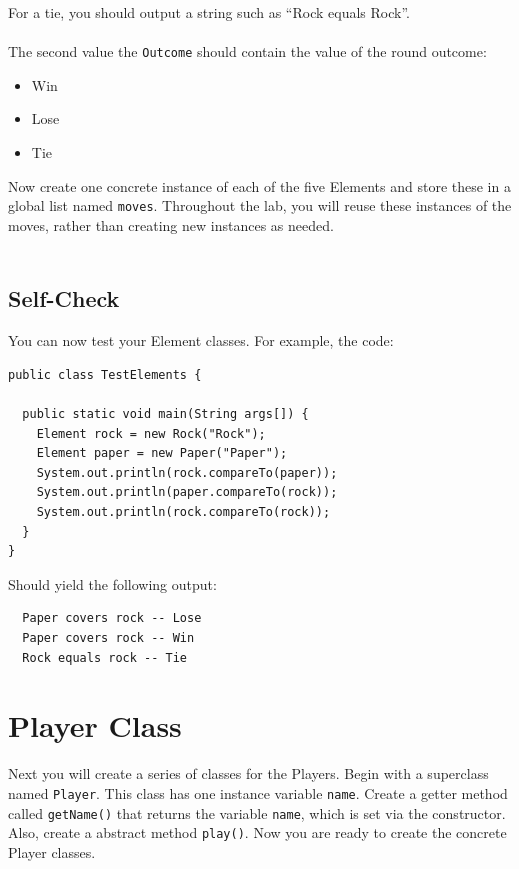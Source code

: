 \documentclass{article}
\begin{document}
\noindent For a tie, you should output a string such as ``Rock equals Rock''.
\\\\
\noindent The second value the \verb|Outcome| should contain the value of the round outcome:
\begin{multicols}{3}
 \begin{itemize}
  \item Win
  \item Lose
  \item Tie
 \end{itemize}

\end{multicols}

\noindent Now create one concrete instance of each of the five Elements and store these in a global list named \verb|moves|. Throughout the lab, you will reuse these instances of the moves, rather than creating new instances as needed.\\\\

\begin{tcolorbox}
 \section*{Self-Check}
 You can now test your Element classes. For example, the code:
 \begin{lstlisting}
public class TestElements {

  public static void main(String args[]) {
    Element rock = new Rock("Rock");
    Element paper = new Paper("Paper");
    System.out.println(rock.compareTo(paper));
    System.out.println(paper.compareTo(rock));
    System.out.println(rock.compareTo(rock));
  }
}
 \end{lstlisting}
 
 Should yield the following output:
 
 \begin{verbatim}
  Paper covers rock -- Lose
  Paper covers rock -- Win
  Rock equals rock -- Tie
 \end{verbatim}
\end{tcolorbox}

\section*{Player Class}
Next you will create a series of classes for the Players. Begin with a superclass named \verb|Player|. This class has one instance variable \verb|name|. Create a getter method called \verb|getName()| that returns the variable \verb|name|, which is set via the constructor. Also, create a abstract method \verb|play()|. Now you are ready to create the concrete Player classes.
\end{document}
